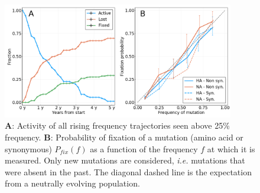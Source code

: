 \documentclass{article}
\begin{document}
	\begin{figure}
		\centering
		\includegraphics[width=0.9\textwidth]{./Figures/Panel3.png}
		\caption{\textbf{A}: Activity of all rising frequency trajectories seen above 25\% frequency. \textbf{B}: Probability of fixation of a mutation (amino acid or synonymous) $P_{fix}(f)$ as a function of the frequency $f$ at which it is measured. Only new mutations are considered, \emph{i.e.} mutations that were absent in the past. The diagonal dashed line is the expectation from a neutrally evolving population.}
		\label{fig:panel3}
	\end{figure}
\end{document}
